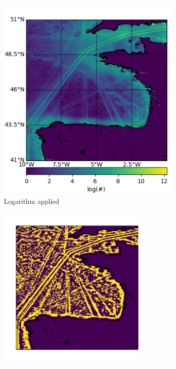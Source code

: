 \documentclass{article}
\begin{document}
\begin{figure}[h] 
  \begin{subfigure}[b]{0.5\linewidth}
    \centering
    \includegraphics[width=0.8\linewidth]{CELTICcrop.pdf} 
    \caption{Logarithm applied} 
    \label{fig7:a} 
    \vspace{4ex}
  \end{subfigure}%
  \begin{subfigure}[b]{0.5\linewidth}
    \centering
    \includegraphics[width=0.8\textwidth]{CELTICopened-crop.pdf} 

\end{subfigure}
\end{figure}
\end{document}
